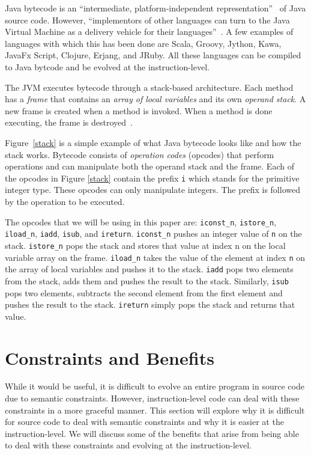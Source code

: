 \documentclass{sig-alternate}
\begin{document}
Java bytecode is an ``intermediate, platform-independent representation''~\cite{FINCH2:2009} of Java source code. However, ``implementors of other languages can turn to the Java Virtual Machine as a delivery vehicle for their languages''~\cite{JVMspec:2013}. A few examples of languages with which this has been done are Scala, Groovy, Jython, Kawa, JavaFx Script, Clojure, Erjang, and JRuby. All these languages can be compiled to Java bytcode and be evolved at the instruction-level. \par

The JVM executes bytecode through a stack-based architecture. Each method has a \textit{frame} that contains an \textit{array of local variables} and its own \textit{operand stack}. A new frame is created when a method is invoked. When a method is done executing, the frame is destroyed~\cite{Oracle:2013}.

Figure~\ref{stack} is a simple example of what Java bytecode looks like and how the stack works. Bytecode consists of \textit{operation codes} (opcodes) that perform operations and can manipulate both the operand stack and the frame. Each of the opcodes in Figure \ref{stack} contain the prefix \texttt{i} which stands for the primitive integer type. These opcodes can only manipulate integers. The prefix is followed by the operation to be executed.\par 

The opcodes that we will be using in this paper are: \texttt{iconst\_n}, \texttt{istore\_n}, \texttt{iload\_n}, \texttt{iadd}, \texttt{isub}, and \texttt{ireturn}. \texttt{iconst\_n} pushes an integer value of \texttt{n} on the stack. \texttt{istore\_n} pops the stack and stores that value at index n on the local variable array on the frame. \texttt{iload\_n} takes the value of the element at index \texttt{n} on the array of local variables and pushes it to the stack. \texttt{iadd} pops two elements from the stack, adds them and pushes the result to the stack. Similarly, \texttt{isub} pops two elements, subtracts the second element from the first element and pushes the result to the stack. \texttt{ireturn} simply pops the stack and returns that value.


\section{Constraints and Benefits}

While it would be useful, it is difficult to evolve an entire program in source code due to semantic constraints. However, instruction-level code can deal with these constraints in a more graceful manner. This section will explore why it is difficult for source code to deal with semantic constraints and why it is easier at the instruction-level. We will discuss some of the benefits that arise from being able to deal with these constraints and evolving at the instruction-level.
\end{document}
